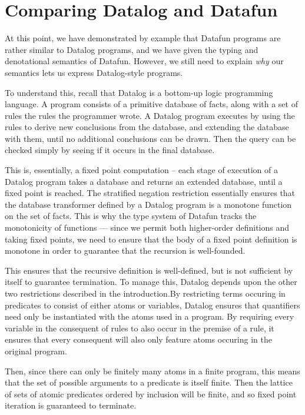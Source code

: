 \section{Comparing Datalog and Datafun} At this point, we have
demonstrated by example that Datafun programs are rather similar to
Datalog programs, and we have given the typing and denotational
semantics of Datafun. However, we still need to explain \emph{why} our
semantics lets us express Datalog-style programs.

To understand this, recall that Datalog is a bottom-up logic
programming language. A program consists of a primitive database of
facts, along with a set of rules the rules the programmer wrote. A
Datalog program executes by using the rules to derive new conclusions
from the database, and extending the database with them, until no
additional conclusions can be drawn. Then the query can be checked
simply by seeing if it occurs in the final database.

This is, essentially, a fixed point computation -- each stage of
execution of a Datalog program takes a database and returns an
extended database, until a fixed point is reached. The stratified
negation restriction essentially ensures that the database transformer
defined by a Datalog program is a monotone function on the set of
facts. This is why the type system of Datafun tracks the monotonicity
of functions --- since we permit both higher-order definitions and
taking fixed points, we need to ensure that the body of a fixed point
definition is monotone in order to guarantee that the recursion is
well-founded.

This ensures that the recursive definition is well-defined, but is not
sufficient by itself to guarantee termination. To manage this, Datalog
depends upon the other two restrictions described in the
introduction.By restricting terms occuring in predicates to consist of
either atoms or variables, Datalog ensures that quantifiers need only
be instantiated with the atoms used in a program. By requiring every
variable in the consequent of rules to also occur in the premise of a
rule, it ensures that every consequent will also only feature atoms
occuring in the original program.

Then, since there can only be finitely many atoms in a finite program,
this means that the set of possible arguments to a predicate is itself
finite. Then the lattice of sets of atomic predicates ordered by
inclusion will be finite, and so fixed point iteration is guaranteed
to terminate.

